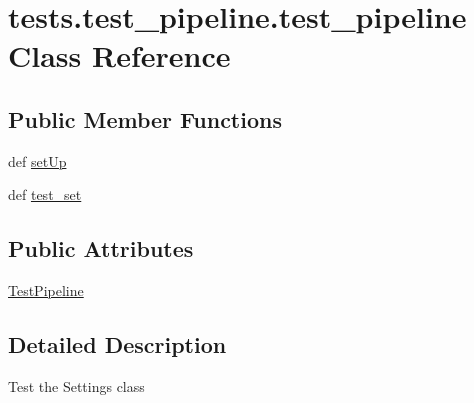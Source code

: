\hypertarget{classtests_1_1test__pipeline_1_1test__pipeline}{\section{tests.\-test\-\_\-pipeline.\-test\-\_\-pipeline \-Class \-Reference}
\label{classtests_1_1test__pipeline_1_1test__pipeline}
}
\subsection*{\-Public \-Member \-Functions}
\begin{DoxyCompactItemize}
\item 
def \hyperlink{classtests_1_1test__pipeline_1_1test__pipeline_a23e259a357121bd73c706f8186063c1f}{set\-Up}
\item 
def \hyperlink{classtests_1_1test__pipeline_1_1test__pipeline_af64f4aa1f9c8fb7321e01f02fdfdac15}{test\-\_\-set}
\end{DoxyCompactItemize}
\subsection*{\-Public \-Attributes}
\begin{DoxyCompactItemize}
\item 
\hyperlink{classtests_1_1test__pipeline_1_1test__pipeline_a8a25885706fb19293b4469350dabfad3}{\-Test\-Pipeline}
\end{DoxyCompactItemize}


\subsection{\-Detailed \-Description}
\begin{DoxyVerb}Test the Settings class\end{DoxyVerb}
 

